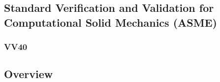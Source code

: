 \subsection{Standard Verification and Validation for Computational Solid Mechanics (ASME)}
\subsubsection*{VV40}



\subsection{Overview}
